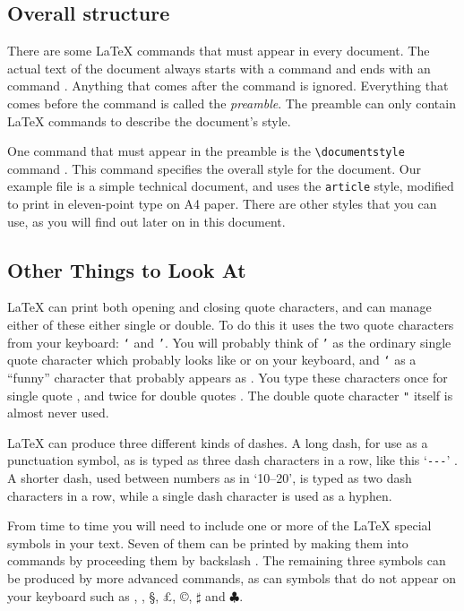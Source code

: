 \subsection{Overall structure}

There are some \LaTeX{} commands that must appear in every document.
The actual text of the document always starts with a
\verb|| command and ends with an \verb||
command .  Anything that comes after the
\verb|| command is ignored.  Everything that comes
before the \verb|| command is called the
{\em preamble\/}. The preamble can only contain \LaTeX{} commands
to describe the document's style.

One command that must appear in the preamble is the
\verb|\documentstyle| command .  This command specifies
the overall style for the document.  Our example file is a simple
technical document, and uses the {\tt article\/} style, modified to
print in eleven-point type on A4 paper.
There are other styles that you can use, as you will
find out later on in this document.

\subsection{Other Things to Look At}

\LaTeX{} can print both opening and closing quote characters, and can manage
either of these either single or double.  To do this it uses the two quote
characters from your keyboard: {\tt `} and {\tt '}. You will probably think of
{\tt '} as the ordinary single quote character which probably looks like
{\tt{}} or {\tt{}} on your keyboard,
and {\tt `} as a ``funny''
character that probably appears as {\tt{}}.
You type these characters once for single quote ,  and twice for
double quotes . The double quote character {\tt "} itself
is almost never used.

\LaTeX{} can produce three different kinds of dashes.
A long dash, for use as a punctuation symbol, as is typed as three dash
characters in a row, like this `\verb|---|' .  A shorter dash,
used between numbers as in `10--20', is typed as two dash
characters in a row, while a single dash character is used as a hyphen.

From time to time you will need to include one or more of the \LaTeX{}
special symbols in your text.  Seven of them can be printed by
making them into commands by proceeding them by backslash
.  The remaining three symbols can be produced by more
advanced commands, as can symbols that do not appear on your keyboard
such as \dag, \ddag, \S, \pounds, \copyright, $\sharp$ and $\clubsuit$.

